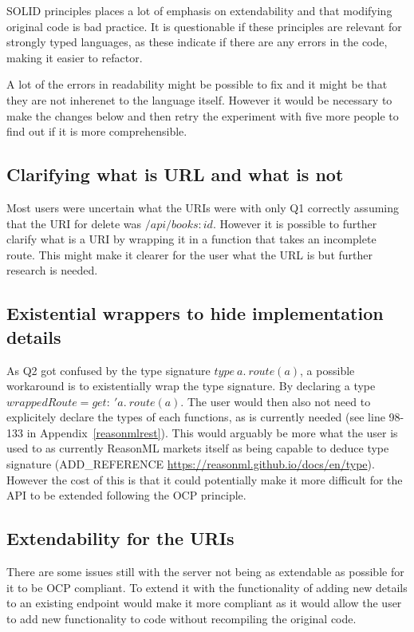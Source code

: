 SOLID principles places a lot of emphasis on extendability and that modifying
original code is bad practice. It is questionable if these principles are
relevant for strongly typed languages, as these indicate if there are any
errors in the code, making it easier to refactor.

A lot of the errors in readability might be possible to fix and it might be
that they are not inherenet to the language itself. However it would be
necessary to make the changes below and then retry the experiment with five 
more people to find out if it is more comprehensible. 

\subsection{Clarifying what is URL and what is not}

Most users were uncertain what the URIs were with only Q1 correctly assuming
that the URI for delete was $/api/books:id$. However it is possible to further
clarify what is a URI by wrapping it in a function that takes an incomplete
route. This might make it clearer for the user what the URL is but further
research is needed.

\subsection{Existential wrappers to hide implementation details}

As Q2 got confused by the type signature $type\ a.\ route(a)$, a possible
workaround is to existentially wrap the type signature.  By declaring a type
$wrappedRoute = {get :\ 'a.\ route(a)}$. The user would then also not need to
explicitely declare the types of each functions, as is currently needed (see
line 98-133 in Appendix~\ref{reasonmlrest}). This would arguably be more what
the user is used to as currently ReasonML markets itself as being capable to
deduce type signature (ADD\_REFERENCE
\url{https://reasonml.github.io/docs/en/type}). However the cost of this is
that it could potentially make it more difficult for the API to be extended
following the OCP principle. 

\subsection{Extendability for the URIs}

There are some issues still with the server not being as extendable as possible
for it to be OCP compliant. To extend it with the functionality of adding new
details to an existing endpoint would make it more compliant as it would allow
the user to add new functionality to code without recompiling the original
code.

